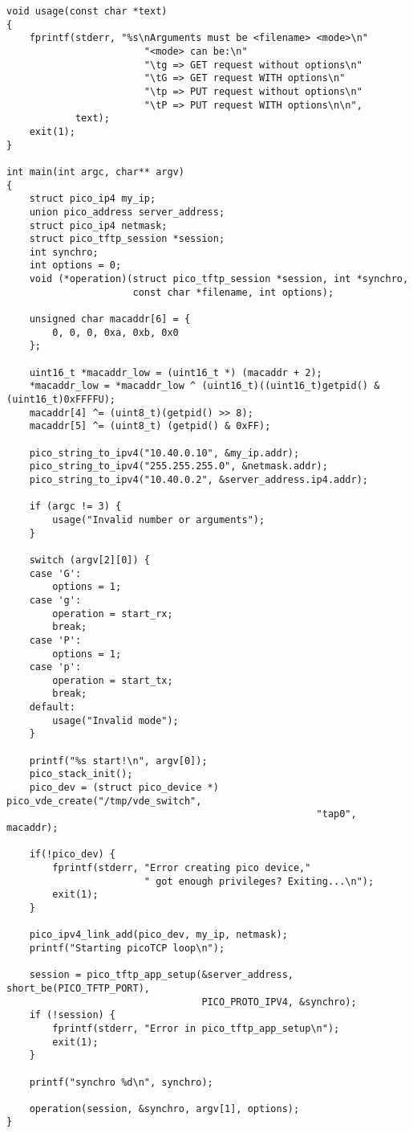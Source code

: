 \begin{verbatim}
void usage(const char *text)
{
    fprintf(stderr, "%s\nArguments must be <filename> <mode>\n"
                        "<mode> can be:\n"
                        "\tg => GET request without options\n"
                        "\tG => GET request WITH options\n"
                        "\tp => PUT request without options\n"
                        "\tP => PUT request WITH options\n\n",
            text);
    exit(1);
}

int main(int argc, char** argv)
{
    struct pico_ip4 my_ip;
    union pico_address server_address;
    struct pico_ip4 netmask;
    struct pico_tftp_session *session;
    int synchro;
    int options = 0;
    void (*operation)(struct pico_tftp_session *session, int *synchro,
                      const char *filename, int options);

    unsigned char macaddr[6] = {
        0, 0, 0, 0xa, 0xb, 0x0
    };

    uint16_t *macaddr_low = (uint16_t *) (macaddr + 2);
    *macaddr_low = *macaddr_low ^ (uint16_t)((uint16_t)getpid() & (uint16_t)0xFFFFU);
    macaddr[4] ^= (uint8_t)(getpid() >> 8);
    macaddr[5] ^= (uint8_t) (getpid() & 0xFF);

    pico_string_to_ipv4("10.40.0.10", &my_ip.addr);
    pico_string_to_ipv4("255.255.255.0", &netmask.addr);
    pico_string_to_ipv4("10.40.0.2", &server_address.ip4.addr);

    if (argc != 3) {
        usage("Invalid number or arguments");
    }

    switch (argv[2][0]) {
    case 'G':
        options = 1;
    case 'g':
        operation = start_rx;
        break;
    case 'P':
        options = 1;
    case 'p':
        operation = start_tx;
        break;
    default:
        usage("Invalid mode");
    }

    printf("%s start!\n", argv[0]);
    pico_stack_init();
    pico_dev = (struct pico_device *) pico_vde_create("/tmp/vde_switch",
                                                      "tap0", macaddr);

    if(!pico_dev) {
        fprintf(stderr, "Error creating pico device,"
                        " got enough privileges? Exiting...\n");
        exit(1);
    }

    pico_ipv4_link_add(pico_dev, my_ip, netmask);
    printf("Starting picoTCP loop\n");

    session = pico_tftp_app_setup(&server_address, short_be(PICO_TFTP_PORT),
                                  PICO_PROTO_IPV4, &synchro);
    if (!session) {
        fprintf(stderr, "Error in pico_tftp_app_setup\n");
        exit(1);
    }

    printf("synchro %d\n", synchro);

    operation(session, &synchro, argv[1], options);
}
\end{verbatim}
